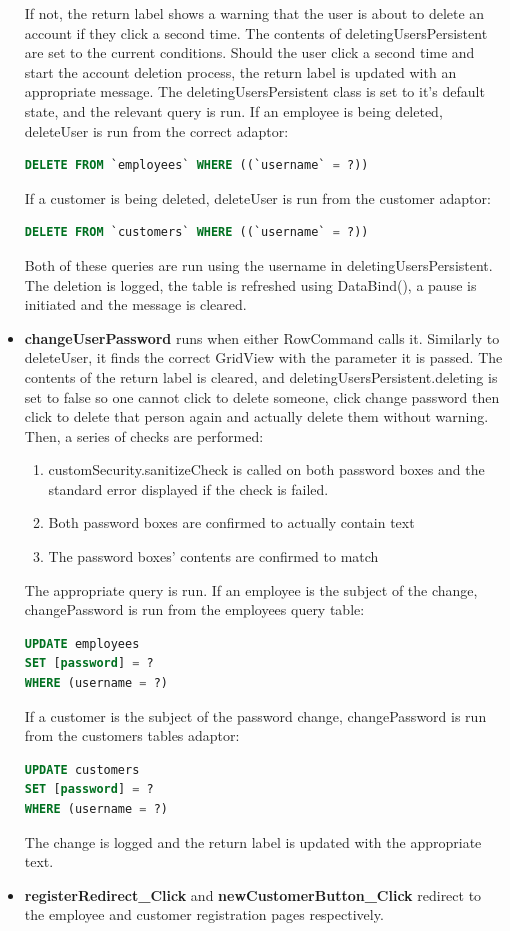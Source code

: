 ﻿\documentclass{article}
\begin{document}
\begin{itemize}
        If not, the return label shows a warning that the user is about to delete an account if they click a second time.
        The contents of deletingUsersPersistent are set to the current conditions.
        Should the user click a second time and start the account deletion process, the return label is updated with an appropriate message.
        The deletingUsersPersistent class is set to it's default state, and the relevant query is run.
        If an employee is being deleted, deleteUser is run from the correct adaptor:
        \begin{lstlisting}[language=SQL]
DELETE FROM `employees` WHERE ((`username` = ?))
        \end{lstlisting}
        If a customer is being deleted, deleteUser is run from the customer adaptor:
        \begin{lstlisting}[language=SQL]
DELETE FROM `customers` WHERE ((`username` = ?))
        \end{lstlisting}
        Both of these queries are run using the username in deletingUsersPersistent.
        The deletion is logged, the table is refreshed using DataBind(), a pause is initiated and the message is cleared.
        \item \textbf{changeUserPassword} runs when either RowCommand calls it.
        Similarly to deleteUser, it finds the correct GridView with the parameter it is passed.
        The contents of the return label is cleared, and deletingUsersPersistent.deleting is set to false so one cannot click to delete someone, click change password then click to delete that person again and actually delete them without warning.
        Then, a series of checks are performed:
        \begin{enumerate}
            \item customSecurity.sanitizeCheck is called on both password boxes and the standard error displayed if the check is failed.
            \item Both password boxes are confirmed to actually contain text
            \item The password boxes' contents are confirmed to match
        \end{enumerate}
        The appropriate query is run.
        If an employee is the subject of the change, changePassword is run from the employees query table:
        \begin{lstlisting}[language=SQL]
UPDATE employees
SET [password] = ?
WHERE (username = ?)
        \end{lstlisting}
        If a customer is the subject of the password change, changePassword is run from the customers tables adaptor:
        \begin{lstlisting}[language=SQL]
UPDATE customers
SET [password] = ?
WHERE (username = ?)
        \end{lstlisting}
        The change is logged and the return label is updated with the appropriate text.
        \item \textbf{registerRedirect\_Click} and \textbf{newCustomerButton\_Click} redirect to the employee and customer registration pages respectively.
    \end{itemize}
\end{document}
